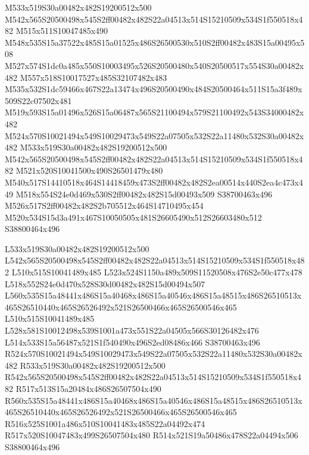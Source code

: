 \documentclass{article}
\begin{document}
\begin{multicols}{2}
M533x519S30a00482x482S19200512x500 M542x565S20500498x545S2ff00482x482S22a04513x514S15210509x534S1f550518x482 M515x511S10047485x490 M548x535S15a37522x485S15a01525x486S26500530x510S2ff00482x483S15a00495x508 M527x574S1dc0a485x550S10003495x526S20500480x540S20500517x554S30a00482x482 M557x518S10017527x485S32107482x483 M535x532S1dc59466x467S22a13474x496S20500490x484S20500464x511S15a3f489x509S22c07502x481 M519x593S15a01496x526S15a06487x565S21100494x579S21100492x543S34000482x482 M524x570S10021494x549S10029473x549S22a07505x532S22a11480x532S30a00482x482 M533x519S30a00482x482S19200512x500 M542x565S20500498x545S2ff00482x482S22a04513x514S15210509x534S1f550518x482 M521x520S10041500x490S26501479x480 M540x517S14410518x464S14418459x473S2ff00482x482S2ea00514x440S2ea4c473x449 M518x554S24e0d469x530S2ff00482x482S15d00493x509 S38700463x496 M526x517S2ff00482x482S2b705512x464S14710495x454 M520x534S15d3a491x467S10050505x481S26605490x512S26603480x512 S38800464x496

L533x519S30a00482x482S19200512x500 L542x565S20500498x545S2ff00482x482S22a04513x514S15210509x534S1f550518x482 L510x515S10041489x485 L523x524S1150a489x509S11520508x476S2e50c477x478 L518x552S24e0d470x528S30d00482x482S15d00494x507 L560x535S15a48441x486S15a40468x486S15a40546x486S15a48515x486S26510513x465S26510440x465S26526492x521S26500466x465S26500546x465 L510x515S10041489x485 L528x581S10012498x539S1001a473x551S22a04505x566S30126482x476 L514x533S15a56487x521S1f540490x496S2ed08486x466 S38700463x496 R524x570S10021494x549S10029473x549S22a07505x532S22a11480x532S30a00482x482 R533x519S30a00482x482S19200512x500 R542x565S20500498x545S2ff00482x482S22a04513x514S15210509x534S1f550518x482 R517x513S15a20484x486S26507504x490 R560x535S15a48441x486S15a40468x486S15a40546x486S15a48515x486S26510513x465S26510440x465S26526492x521S26500466x465S26500546x465 R516x525S1001a486x510S10041483x485S22a04492x474 R517x520S10047483x499S26507504x480 R514x521S19a50486x478S22a04494x506 S38800464x496


\end{multicols}
\end{document}
